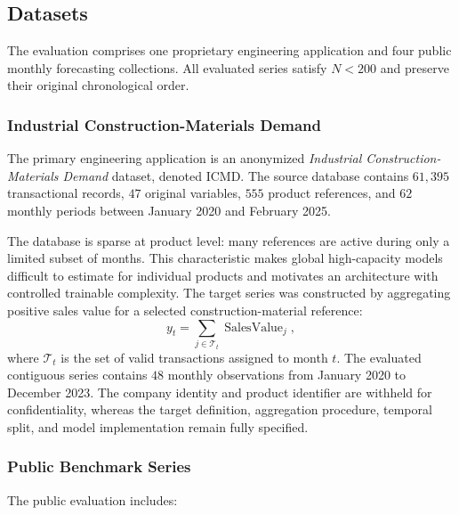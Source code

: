 \documentclass[review,number,sort&compress]{elsarticle}
\begin{document}
\subsection{Datasets}
\label{subsec:datasets}

The evaluation comprises one proprietary engineering application and four
public monthly forecasting collections. All evaluated series satisfy
$N<200$ and preserve their original chronological order.

\subsubsection{Industrial Construction-Materials Demand}

The primary engineering application is an anonymized
\emph{Industrial Construction-Materials Demand} dataset, denoted ICMD. The
source database contains $61{,}395$ transactional records, $47$ original
variables, $555$ product references, and $62$ monthly periods between January
2020 and February 2025.

The database is sparse at product level: many references are active during only
a limited subset of months. This characteristic makes global high-capacity
models difficult to estimate for individual products and motivates an
architecture with controlled trainable complexity.
The target series was constructed by aggregating positive sales value for a
selected construction-material reference:
\begin{equation}
    y_t
    =
    \sum_{j\in\mathcal{T}_t}
    \operatorname{SalesValue}_j,
    \label{eq:industrial_aggregation}
\end{equation}
where $\mathcal{T}_t$ is the set of valid transactions assigned to month $t$.
The evaluated contiguous series contains $48$ monthly observations from January
2020 to December 2023. The company identity and product identifier are withheld
for confidentiality, whereas the target definition, aggregation procedure,
temporal split, and model implementation remain fully specified.

\subsubsection{Public Benchmark Series}

The public evaluation includes:
\end{document}
